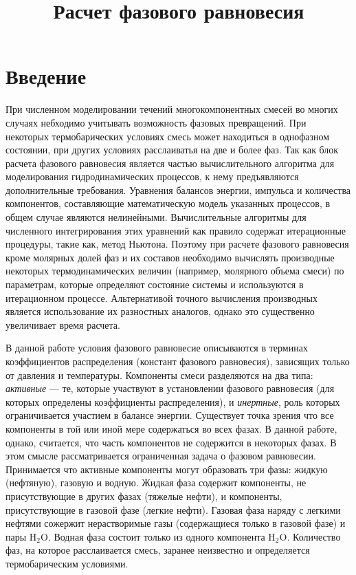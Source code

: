 \documentclass[12pt]{article}
\title{Расчет фазового равновесия}
\begin{document}
\maketitle

\section{Введение}

При численном моделировании течений многокомпонентных смесей во многих случаях небходимо учитывать возможность фазовых превращений. При некоторых термобарических условиях смесь может находиться в однофазном состоянии, при других условиях расслаиватья на две и более фаз. Так как блок расчета фазового равновесия является частью вычислительного алгоритма для моделирования гидродинамических процессов, к нему предъявляются дополнительные требования. Уравнения балансов энергии, импульса и количества компонентов, составляющие математическую модель указанных процессов, в общем случае являются нелинейными. Вычислительные алгоритмы для численного интегрирования этих уравнений как правило содержат итерационные процедуры, такие как, метод Ньютона. Поэтому при расчете фазового равновесия кроме молярных долей фаз и их составов необходимо вычислять производные некоторых термодинамических величин (например, молярного объема смеси) по параметрам, которые определяют состояние системы и используются в итерационном процессе. Альтернативой точного вычисления производных является использование их разностных аналогов, однако это существенно увеличивает время расчета.

В данной работе условия фазового равновесие описываются в терминах коэффициентов распределения (констант фазового равновесия), зависящих только от давления и температуры. Компоненты смеси разделяются на два типа: \emph{активные} --- те, которые участвуют в установлении фазового равновесия (для которых определены коэффициенты распределения), и \emph{инертные}, роль которых ограничивается участием в балансе энергии. Существует точка зрения что все компоненты в той или иной мере содержаться во всех фазах. В данной работе, однако, считается, что часть компонентов не содержится в некоторых фазах. В этом смысле рассматривается ограниченная задача о фазовом равновесии. Принимается что активные компоненты могут образовать три фазы: жидкую (нефтяную), газовую и водную.  Жидкая фаза содержит компоненты, не присутствующие в других фазах (тяжелые нефти), и компоненты, присутствующие в газовой фазе (легкие нефти). Газовая фаза наряду с легкими нефтями сожержит нерастворимые газы (содержащиеся только в газовой фазе) и пары $\mathrm{H_2O}$. Водная фаза состоит только из одного компонента $\mathrm{H_2O}$. Количество фаз, на которое расслаивается смесь, заранее неизвестно и определяется термобарическим условиями.
\end{document}
